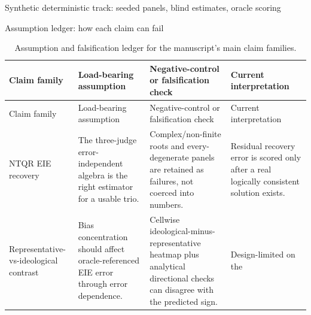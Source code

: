 \documentclass[
  ignorenonframetext,
]{beamer}
\begin{document}
\begin{frame}{Synthetic deterministic track:
seeded panels, blind estimates, oracle scoring}
\begin{block}{Assumption ledger: how each claim can fail}
\begin{longtable}[]{@{}
  >{\raggedright\arraybackslash}p{}
  >{\raggedright\arraybackslash}p{}
  >{\raggedright\arraybackslash}p{}
  >{\raggedright\arraybackslash}p{}@{}}
\caption{Assumption and falsification ledger for the manuscript's main
claim families.}\label{tbl:falsification}\tabularnewline
\toprule\noalign{}
\begin{minipage}[b]{\linewidth}\raggedright
Claim family
\end{minipage} & \begin{minipage}[b]{\linewidth}\raggedright
Load-bearing assumption
\end{minipage} & \begin{minipage}[b]{\linewidth}\raggedright
Negative-control or falsification check
\end{minipage} & \begin{minipage}[b]{\linewidth}\raggedright
Current interpretation
\end{minipage} \\
\midrule\noalign{}
\endfirsthead
\toprule\noalign{}
\begin{minipage}[b]{\linewidth}\raggedright
Claim family
\end{minipage} & \begin{minipage}[b]{\linewidth}\raggedright
Load-bearing assumption
\end{minipage} & \begin{minipage}[b]{\linewidth}\raggedright
Negative-control or falsification check
\end{minipage} & \begin{minipage}[b]{\linewidth}\raggedright
Current interpretation
\end{minipage} \\
\midrule\noalign{}
\endhead
NTQR EIE recovery & The three-judge error-independent algebra is the
right estimator for a usable trio. & Complex/non-finite roots and
every-degenerate panels are retained as failures, not coerced into
numbers. & Residual recovery error is scored only after a real logically
consistent solution exists. \\
Representative-vs-ideological contrast & Bias concentration should
affect oracle-referenced EIE error through error dependence. & Cellwise
ideological-minus-representative heatmap plus analytical directional
checks can disagree with the predicted sign. & Design-limited on the

\end{longtable}
\end{block}
\end{frame}
\end{document}
